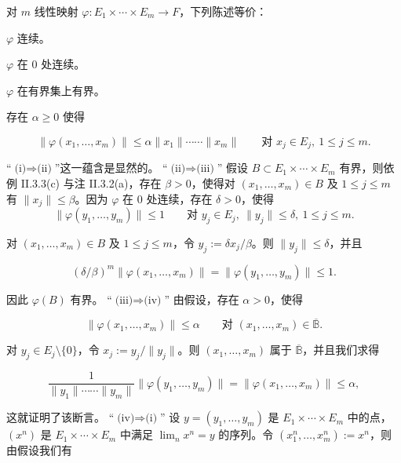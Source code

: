 \begin{proposition}

对 $ m $ 线性映射 $ \varphi : E_1 \times \cdots \times E_m \to F $，下列陈述等价：

\begin{subitems}
\item

$ \varphi $ 连续。

\item

$ \varphi $ 在 $ 0 $ 处连续。

\item

$ \varphi $ 在有界集上有界。

\item

存在 $ \alpha \ge 0 $ 使得

\[
\|\varphi(x_1, \ldots, x_m)\| \le \alpha\|x_1\| \cdots\cdots \|x_m\| \qquad \text{对 } x_j \in E_j ,\ 1 \le j \le m .
\]

\proofhead
“$ \text{(i)}\Rightarrow\text{(ii)} $”这一蕴含是显然的。
“$ \text{(ii)}\Rightarrow\text{(iii)} $” 假设 $ B \subset E_1 \times \cdots \times E_m $ 有界，则依例 II.3.3(c) 与注 II.3.2(a)，存在 $ \beta > 0 $，使得对 $ (x_1, \ldots, x_m) \in B $ 及 $ 1 \le j \le m $ 有 $ \|x_j\| \le \beta $。因为 $ \varphi $ 在 $ 0 $ 处连续，存在 $ \delta > 0 $，使得
\[
\|\varphi(y_1, \ldots, y_m)\| \le 1 \qquad \text{对 } y_j \in E_j ,\ \|y_j\| \le \delta ,\ 1 \le j \le m .
\]

对 $ (x_1, \ldots, x_m) \in B $ 及 $ 1 \le j \le m $，令 $ y_j := \delta x_j/\beta $。则 $ \|y_j\| \le \delta $，并且

\[
(\delta/\beta)^m\|\varphi(x_1, \ldots, x_m)\| = \|\varphi(y_1, \ldots, y_m)\| \le 1 .
\]

因此 $ \varphi(B) $ 有界。
“$ \text{(iii)}\Rightarrow\text{(iv)} $” 由假设，存在 $ \alpha > 0 $，使得

\[
\|\varphi(x_1, \ldots, x_m)\| \le \alpha \qquad \text{对 } (x_1, \ldots, x_m) \in \overline{\mathbb{B}} .
\]

对 $ y_j \in E_j\setminus\{0\} $，令 $ x_j := y_j/\|y_j\| $。则 $ (x_1, \ldots, x_m) $ 属于 $ \overline{\mathbb{B}} $，并且我们求得

\[
\frac{1}{\|y_1\| \cdots\cdots \|y_m\|}\|\varphi(y_1, \ldots, y_m)\| = \|\varphi(x_1, \ldots, x_m)\| \le \alpha ,
\]

这就证明了该断言。
“$ \text{(iv)}\Rightarrow\text{(i)} $” 设 $ y = (y_1, \ldots, y_m) $ 是 $ E_1 \times \cdots \times E_m $ 中的点，$ (x^n) $ 是 $ E_1 \times \cdots \times E_m $ 中满足 $ \lim_n x^n = y $ 的序列。令 $ (x_1^n, \ldots, x_m^n) := x^n $，则由假设我们有


\end{subitems}
\end{proposition}
